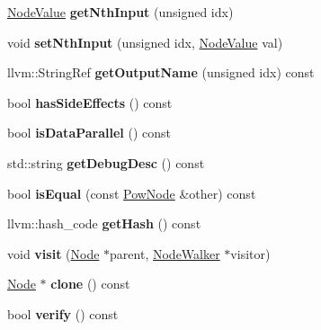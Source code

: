 \begin{DoxyCompactItemize}
\hyperlink{structglow_1_1_node_value}{Node\+Value} {\bfseries get\+Nth\+Input} (unsigned idx)
\item 
\mbox{\label{classglow_1_1_pow_node_a61fbe0e1b6b9a337e0d7b5c807ad9ca1}} 
void {\bfseries set\+Nth\+Input} (unsigned idx, \hyperlink{structglow_1_1_node_value}{Node\+Value} val)
\item 
\mbox{\label{classglow_1_1_pow_node_add374fd6c349ec08c092782861180c0c}} 
llvm\+::\+String\+Ref {\bfseries get\+Output\+Name} (unsigned idx) const
\item 
\mbox{\label{classglow_1_1_pow_node_a6b59935fbd317aa2c52cdec085a06d9e}} 
bool {\bfseries has\+Side\+Effects} () const
\item 
\mbox{\label{classglow_1_1_pow_node_abdf8f050ea3988afae5ba34e59c020fc}} 
bool {\bfseries is\+Data\+Parallel} () const
\item 
\mbox{\label{classglow_1_1_pow_node_a36508d005434110c8a1c0ecfbb443cb9}} 
std\+::string {\bfseries get\+Debug\+Desc} () const
\item 
\mbox{\label{classglow_1_1_pow_node_a6774f928aa0bb65bd284c9c4c44bc0ee}} 
bool {\bfseries is\+Equal} (const \hyperlink{classglow_1_1_pow_node}{Pow\+Node} \&other) const
\item 
\mbox{\label{classglow_1_1_pow_node_a085e45411777b3df3c4e0b04dac92bcd}} 
llvm\+::hash\+\_\+code {\bfseries get\+Hash} () const
\item 
\mbox{\label{classglow_1_1_pow_node_aa9293ed678503c0663874b7e41f177e4}} 
void {\bfseries visit} (\hyperlink{classglow_1_1_node}{Node} $\ast$parent, \hyperlink{classglow_1_1_node_walker}{Node\+Walker} $\ast$visitor)
\item 
\mbox{\label{classglow_1_1_pow_node_ad1913c0ff1c78a3605921aaf30540973}} 
\hyperlink{classglow_1_1_node}{Node} $\ast$ {\bfseries clone} () const
\item 
\mbox{\label{classglow_1_1_pow_node_aa764f6f0b0bc4986c8c54084ff1aaa5a}} 
bool {\bfseries verify} () const
\end{DoxyCompactItemize}
